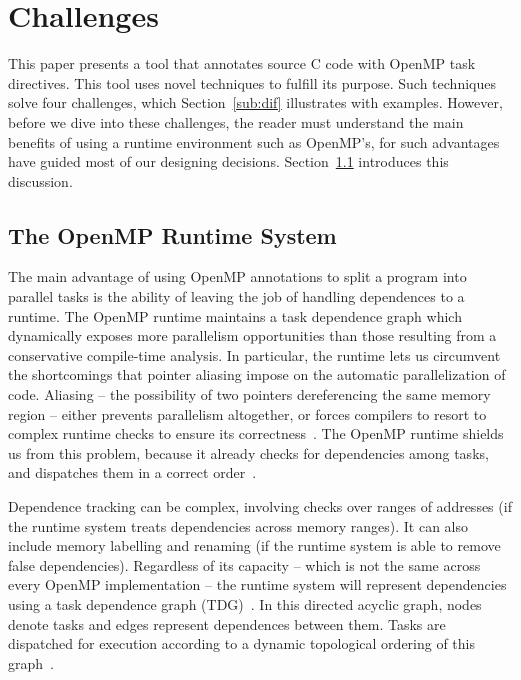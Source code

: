 \documentclass[sigplan,10pt,review,anonymous]{acmart}
\begin{document}
\section{Challenges}
\label{sec:ovf}

This paper presents a tool that annotates source C code with OpenMP task
directives.
This tool uses novel techniques to fulfill its purpose.
Such techniques solve four challenges, which Section~\ref{sub:dif}
illustrates with examples.
However, before we dive into these challenges, the reader must understand
the main benefits of using a runtime environment such as OpenMP's, for
such advantages have guided most of our designing decisions.
Section~\ref{sub:adv} introduces this discussion.

\subsection{The OpenMP Runtime System}
\label{sub:adv}

The main advantage of using OpenMP annotations to split a program into parallel
tasks is
the ability  of leaving the job of  handling dependences to a runtime.
The OpenMP runtime maintains a task dependence graph which dynamically exposes more parallelism 
opportunities than those resulting from a conservative  compile-time  analysis.
In particular, the runtime lets us circumvent the shortcomings that pointer aliasing
impose on the automatic parallelization of code.
Aliasing -- the possibility of two pointers dereferencing the same
memory region -- either prevents parallelism altogether, or forces compilers to
resort to complex runtime checks to ensure its correctness~\cite{Alves15,Rus02}.
The OpenMP runtime shields us from this problem, because
it already checks for dependencies among tasks, and dispatches them in a
correct order~\cite{LaGrone11}.

Dependence tracking can be complex, involving checks over ranges of addresses
(if the runtime system treats dependencies across memory ranges).
It can also include memory labelling and renaming (if the
runtime system is able to remove false dependencies).
Regardless of its capacity -- which is not the same across every OpenMP
implementation -- the runtime system will represent dependencies using a task
dependence graph (TDG)~\cite{Duran08}.
In this directed acyclic graph, nodes denote tasks and edges represent
dependences between them.
Tasks are dispatched for execution according to a dynamic topological ordering of
this graph~\cite{Planas15}.
\end{document}
